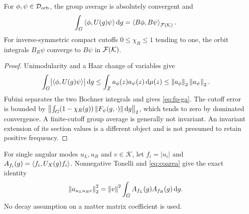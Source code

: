 \begin{proposition}
For $\phi,\psi\in\mathcal D_{\mathrm{orb}}$, the group average is absolutely
convergent and
\begin{equation}
 \int_G\left\langle\phi,U(g)\psi\right\rangle\mathop{}\!\mathrm d g=\left\langle B\phi,B\psi\right\rangle_{\mathcal F(\mathcal K)}.
 \label{eq:fp-ga}
\end{equation}
For inverse-symmetric compact cutoffs $0\le\chi_R\le1$ tending to one,
the orbit integrals $B_R\psi$ converge to $B\psi$ in $\mathcal F(\mathcal K)$.
\end{proposition}
\begin{proof}
Unimodularity and a Haar change of variables give
\begin{equation}
 \int_G\bigl|\left\langle\phi,U(g)\psi\right\rangle\bigr|\mathop{}\!\mathrm d g
 \le\int_Za_\phi(z)a_\psi(z)\mathop{}\!\mathrm d\mu(z)
 \le\left\lVert a_\phi\right\rVert_2\left\lVert a_\psi\right\rVert_2.
\end{equation}
Fubini separates the two Bochner integrals and gives \eqref{eq:fp-ga}.
The cutoff error is bounded by
$\left\lVert\int_G(1-\chi_R(g))\left\lVert F_\psi(g,\cdot)\right\rVert\mathop{}\!\mathrm d g\right\rVert_2$,
which tends to zero by dominated convergence. A finite-cutoff group average
is generally not invariant. An invariant extension of its section values is
a different object and is not presumed to retain positive frequency.
\end{proof}

For single angular modes $u_L,u_R$ and $v\in\mathcal K$, let
$f_i=|u_i|$ and $A_{f_i}(g)=\left\langle f_i,U_X(g)f_i\right\rangle$.
Nonnegative Tonelli and \eqref{eq:coarea} give the exact identity
\begin{equation}
 \left\lVert a_{u_Lu_Rv}\right\rVert_2^2
 =\left\lVert v\right\rVert^2\int_G A_{f_L}(g)A_{f_R}(g)\mathop{}\!\mathrm d g.
 \label{eq:orbit-autocorrelation}
\end{equation}
No decay assumption on a matter matrix coefficient is used.


